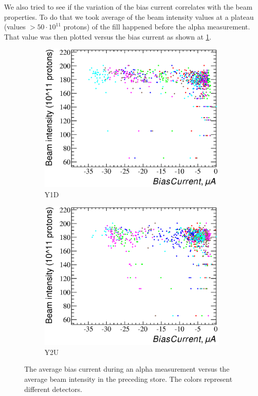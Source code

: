 \documentclass[a4paper,12pt]{article}
\begin{document}
We also tried to see if the variation of the bias current correlates with the
beam properties. To do that we took average of the beam intensity values at a
plateau (values $> 50 \cdot 10^{11}$ protons) of the fill happened before the
alpha measurement. That value was then plotted versus the bias current as
shown at \cref{fig:bc_vs_beamcurrent}.

\begin{figure}
\begin{subfigure}[t]{0.5\textwidth}
\includegraphics[width=\textwidth]{gfx/run13_alpha_study/Y1D/c_hBiasCurrent_BeamCurrent.eps}
\caption{Y1D}
\end{subfigure}
%
\begin{subfigure}[t]{0.5\textwidth}
\includegraphics[width=\textwidth]{gfx/run13_alpha_study/Y2U/c_hBiasCurrent_BeamCurrent.eps}
\caption{Y2U}
\end{subfigure}
%
\caption{The average bias current during an alpha measurement versus the average
beam intensity in the preceding store. The colors represent different
detectors.}
\label{fig:bc_vs_beamcurrent}
\end{figure}
\end{document}
